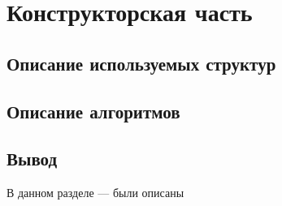 \chapter{Конструкторская часть}

\section{Описание используемых структур}


\section{Описание алгоритмов}
\begin{center}	
%	
\end{center}

\section*{Вывод}
В данном разделе --- были описаны 